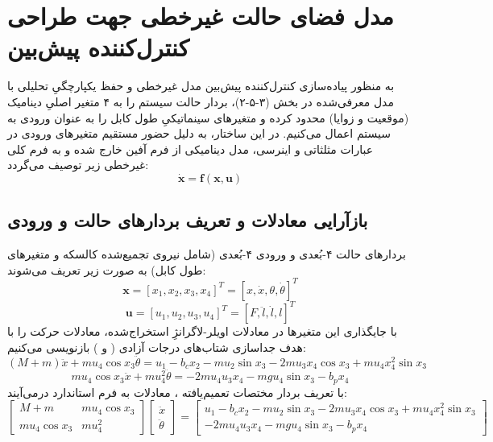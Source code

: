 \section{مدل فضای حالت غیرخطی جهت طراحی کنترل‌کننده پیش‌بین }

به منظور پیاده‌سازی کنترل‌کننده پیش‌بین مدل غیرخطی  و حفظ یکپارچگیِ تحلیلی با مدل معرفی‌شده در بخش (۳-۵-۲)، بردار حالت سیستم را به ۴ متغیر اصلیِ دینامیک (موقعیت و زوایا) محدود کرده و متغیرهای سینماتیکیِ طول کابل را به عنوان ورودی به سیستم اعمال می‌کنیم.
در این ساختار، به دلیل حضور مستقیم متغیرهای ورودی در عبارات مثلثاتی و اینرسی، مدل دینامیکی از فرم آفین خارج شده و به فرم کلی غیرخطی  زیر توصیف می‌گردد:
\[
    \dot{\mathbf{x}} = \mathbf{f}(\mathbf{x}, \mathbf{u})
\]

\subsection{بازآرایی معادلات و تعریف بردارهای حالت و ورودی}
بردارهای حالت ۴-بُعدی و ورودی ۴-بُعدی (شامل نیروی تجمیع‌شده کالسکه  و متغیرهای طول کابل) به صورت زیر تعریف می‌شوند:
\[
    \mathbf{x} = [x_1, x_2, x_3, x_4]^T = [x, \dot{x}, \theta, \dot{\theta}]^T
\]
\[
    \mathbf{u} = [u_1, u_2, u_3, u_4]^T = [F, \ddot{l}, \dot{l}, l]^T
\]
با جایگذاری این متغیرها در معادلات اویلر-لاگرانژِ استخراج‌شده، معادلات حرکت را با هدف جداسازی شتاب‌های درجات آزادی ( و \lr{$\ddot{\theta}$}) بازنویسی می‌کنیم:
\[
    (M+m)\ddot{x} + m u_4\cos x_3 \ddot{\theta} = u_1 - b_c x_2 - m u_2\sin x_3 - 2m u_3 x_4\cos x_3 + m u_4 x_4^2\sin x_3
\]
\[
    m u_4\cos x_3 \ddot{x} + m u_4^2 \ddot{\theta} = -2m u_4 u_3 x_4 - mg u_4\sin x_3 - b_p x_4
\]
با تعریف بردار مختصات تعمیم‌یافته ، معادلات به فرم استاندارد  درمی‌آیند:
\[
    \begin{bmatrix}
        M+m           & m u_4\cos x_3 \\
        m u_4\cos x_3 & m u_4^2
    \end{bmatrix}
    \begin{bmatrix}
        \ddot{x} \\ \ddot{\theta}
    \end{bmatrix}
    =
    \begin{bmatrix}
        u_1 - b_c x_2 - m u_2\sin x_3 - 2m u_3 x_4\cos x_3 + m u_4 x_4^2\sin x_3 \\
        -2m u_4 u_3 x_4 - mg u_4\sin x_3 - b_p x_4
    \end{bmatrix}
\]

